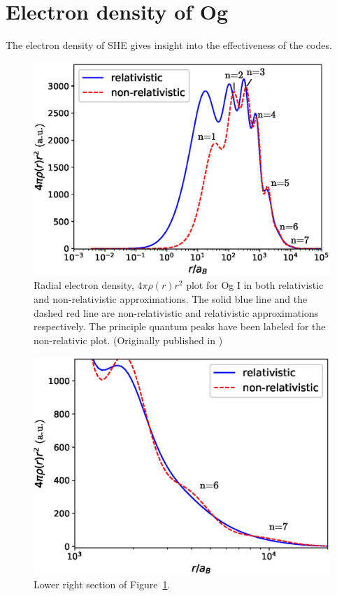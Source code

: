 \documentclass[10pt,a4paper, twoside, openright]{report}
\begin{document}
\section{Electron density of  Og} \label{sec:Relativistic}
The electron density of SHE gives insight into the effectiveness of the codes.
\begin{figure} 
\includegraphics[scale=0.8]{./figures/Ogplot.eps}
\caption[Relativistic and non-relativistic radial electron density of Og I.]{Radial electron density, $4\pi\rho(r)r^2$ plot for Og I in both relativistic and non-relativistic approximations. The solid blue line and the dashed red line are non-relativistic and relativistic approximations respectively. The principle quantum peaks have been labeled for the non-relativic plot. (Originally published in \cite{LDFOg2018})\label{Og_plot}}
\end{figure}
\begin{figure}
\includegraphics[scale=0.8]{./figures/Ogplot_zoom.eps}
\caption{Lower right section of  Figure~\ref{Og_plot}.\label{Og_plot_zoom}}
\end{figure}
\end{document}
